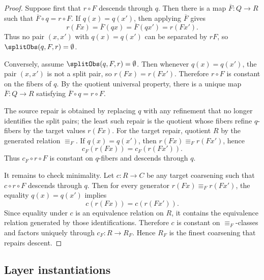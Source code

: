 \documentclass[11pt]{article}
\theoremstyle{definition}
\begin{document}
\begin{proof}
Suppose first that \(r\circ F\) descends through \(q\).  Then there is
a map \(\overline F:Q\to R\) such that
\(\overline F\circ q=r\circ F\).  If \(q(x)=q(x')\), then applying
\(\overline F\) gives
\[
  r(Fx)=\overline F(qx)=\overline F(qx')=r(Fx').
\]
Thus no pair \((x,x')\) with \(q(x)=q(x')\) can be separated by
\(rF\), so \(\splitObs(q,F,r)=\emptyset\).

Conversely, assume \(\splitObs(q,F,r)=\emptyset\).  Then whenever
\(q(x)=q(x')\), the pair \((x,x')\) is not a split pair, so
\(r(Fx)=r(Fx')\).  Therefore \(r\circ F\) is constant on the fibers
of \(q\).  By the quotient universal property, there is a unique map
\(\overline F:Q\to R\) satisfying
\(\overline F\circ q=r\circ F\).

The source repair is obtained by replacing \(q\) with any refinement
that no longer identifies the split pairs; the least such repair is
the quotient whose fibers refine \(q\)-fibers by the target values
\(r(Fx)\).  For the target repair, quotient \(R\) by the generated
relation \(\equiv_F\).  If \(q(x)=q(x')\), then
\(r(Fx)\equiv_F r(Fx')\), hence
\[
  c_F(r(Fx))=c_F(r(Fx')).
\]
Thus \(c_F\circ r\circ F\) is constant on \(q\)-fibers and descends
through \(q\).

It remains to check minimality.  Let \(c:R\to C\) be any target
coarsening such that \(c\circ r\circ F\) descends through \(q\).  Then
for every generator \(r(Fx)\equiv_F r(Fx')\), the equality
\(q(x)=q(x')\) implies
\[
  c(r(Fx))=c(r(Fx')).
\]
Since equality under \(c\) is an equivalence relation on \(R\), it
contains the equivalence relation generated by those identifications.
Therefore \(c\) is constant on \(\equiv_F\)-classes and factors
uniquely through \(c_F:R\to R_F\).  Hence \(R_F\) is the finest
coarsening that repairs descent.
\end{proof}

\subsection*{Layer instantiations}\label{layer-inst:F2}
\end{document}
